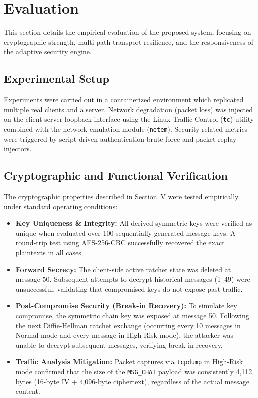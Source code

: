 \documentclass[conference]{IEEEtran}
\begin{document}
\section{Evaluation}
\label{sec:evaluation}

This section details the empirical evaluation of the proposed system, focusing on cryptographic strength, multi-path transport resilience, and the responsiveness of the adaptive security engine.

\subsection{Experimental Setup}

Experiments were carried out in a containerized environment which replicated multiple real clients and a server. Network degradation (packet loss) was injected on the client-server loopback interface using the Linux Traffic Control (\texttt{tc}) utility combined with the network emulation module (\texttt{netem}). Security-related metrics were triggered by script-driven authentication brute-force and packet replay injectors.

\subsection{Cryptographic and Functional Verification}

The cryptographic properties described in Section~V were tested empirically under standard operating conditions:
\begin{itemize}
    \item \textbf{Key Uniqueness \& Integrity:} All derived symmetric keys were verified as unique when evaluated over 100 sequentially generated message keys. A round-trip test using AES-256-CBC successfully recovered the exact plaintexts in all cases.
    \item \textbf{Forward Secrecy:} The client-side active ratchet state was deleted at message 50. Subsequent attempts to decrypt historical messages (1--49) were unsuccessful, validating that compromised keys do not expose past traffic.
    \item \textbf{Post-Compromise Security (Break-in Recovery):} To simulate key compromise, the symmetric chain key was exposed at message 50. Following the next Diffie-Hellman ratchet exchange (occurring every 10 messages in Normal mode and every message in High-Risk mode), the attacker was unable to decrypt subsequent messages, verifying break-in recovery.
    \item \textbf{Traffic Analysis Mitigation:} Packet captures via \texttt{tcpdump} in High-Risk mode confirmed that the size of the \texttt{MSG\_CHAT} payload was consistently 4,112 bytes (16-byte IV + 4,096-byte ciphertext), regardless of the actual message content.
\end{itemize}
\end{document}

